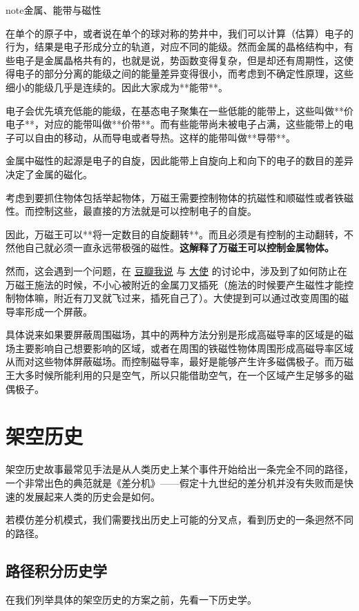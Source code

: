 \documentclass[letterpaper,10pt,english]{sphinxmanual}
\begin{document}
\begin{notice}{note}{金属、能带与磁性}

在单个的原子中，或者说在单个的球对称的势井中，我们可以计算（估算）电子的行为，结果是电子形成分立的轨道，对应不同的能级。然而金属的晶格结构中，有些电子是金属晶格共有的，也就是说，势函数变得复杂，但是却还有周期性，这使得电子的部分分离的能级之间的能量差异变得很小，而考虑到不确定性原理，这些细小的能级几乎是连续的。因此大家成为**能带**。

电子会优先填充低能的能级，在基态电子聚集在一些低能的能带上，这些叫做**价电子**，对应的能带叫做**价带**。而有些能带尚未被电子占满，这些能带上的电子可以自由的移动，从而导电或者导热。这样的能带叫做**导带**。

金属中磁性的起源是电子的自旋，因此能带上自旋向上和向下的电子的数目的差异决定了金属的磁化。
\end{notice}

考虑到要抓住物体包括举起物体，万磁王需要控制物体的抗磁性和顺磁性或者铁磁性。而控制这些，最直接的方法就是可以控制电子的自旋。

因此，万磁王可以**将一定数目的自旋翻转**。而且必须是有控制的主动翻转，不然他自己就必须一直永远带极强的磁性。\textbf{这解释了万磁王可以控制金属物体。}

然而，这会遇到一个问题，在 \href{http://www.douban.com/people/emptymalei/status/1535791054/}{豆瓣我说} 与 \href{http://www.douban.com/people/Raman/}{大使} 的讨论中，涉及到了如何防止在万磁王施法的时候，不小心被附近的金属刀叉插死（施法的时候要产生磁性才能控制物体嘛，附近有刀叉就飞过来，插死自己了）。大使提到可以通过改变周围的磁导率形成一个屏蔽。

具体说来如果要屏蔽周围磁场，其中的两种方法分别是形成高磁导率的区域是的磁场主要影响自己想要影响的区域，或者在周围的铁磁性物体周围形成高磁导率区域从而对这些物体屏蔽磁场。而控制磁导率，最好是能够产生许多磁偶极子。而万磁王大多时候所能利用的只是空气，所以只能借助空气，在一个区域产生足够多的磁偶极子。


\section{架空历史}
\label{alternatehistory::doc}\label{alternatehistory:id1}
架空历史故事最常见手法是从人类历史上某个事件开始给出一条完全不同的路径，一个非常出色的典范就是《差分机》——假定十九世纪的差分机并没有失败而是快速的发展起来人类的历史会是如何。

若模仿差分机模式，我们需要找出历史上可能的分叉点，看到历史的一条迥然不同的路径。


\subsection{路径积分历史学}
\label{alternatehistory:id2}
在我们列举具体的架空历史的方案之前，先看一下历史学。
\end{document}
